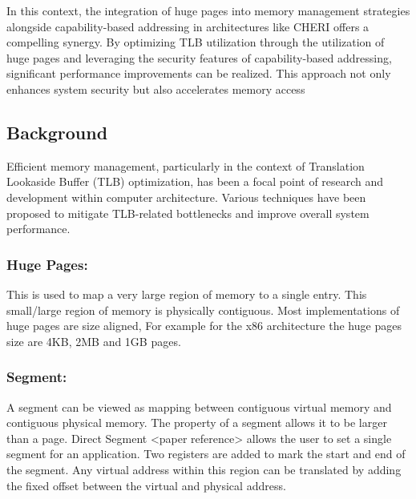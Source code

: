 \documentclass[acmsmall,screen,review]{acmart}
\begin{document}
In this context, the integration of huge pages into memory management 
strategies alongside capability-based addressing in architectures like 
CHERI offers a compelling synergy. By optimizing TLB utilization through the 
utilization of huge pages and leveraging the security features of capability-based addressing, 
significant performance improvements can be realized. This approach not only enhances 
system security but also accelerates memory access

\subsection{Background}
Efficient memory management, particularly in the context of 
Translation Lookaside Buffer (TLB) optimization, has been a focal point of 
research and development within computer architecture. Various techniques have been 
proposed to mitigate TLB-related bottlenecks and improve overall system performance.

\subsubsection{Huge Pages:}
This is used to map a very large region of memory to a 
single entry. This small/large region of memory is physically
contiguous. Most implementations of huge pages are size
aligned, For example for the x86 architecture the huge pages 
size are 4KB, 2MB and 1GB pages. 

\subsubsection{Segment:}
A segment can be viewed as mapping between contiguous virtual
memory and contiguous physical memory. The property of a 
segment allows it to be larger than a page. Direct Segment
<paper reference> allows the user to set a single segment
for an application. Two registers are added to mark the start
and end of the segment. Any virtual address within this region
can be translated by adding the fixed offset between the virtual
and physical address.
\end{document}
